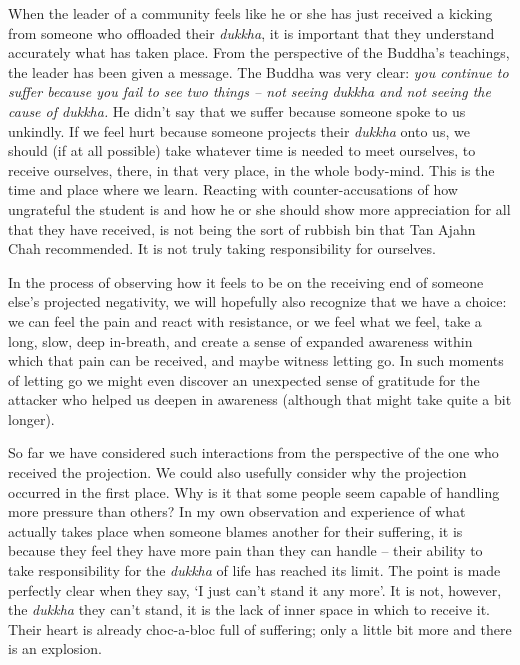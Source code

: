 When the leader of a community feels like he or she has just received a
kicking from someone who offloaded their \emph{dukkha}, it is important
that they understand accurately what has taken place. From the
perspective of the Buddha's teachings, the leader has been given a
message. The Buddha was very clear: \emph{you continue to suffer because
you fail to see two things -- not seeing dukkha and not seeing the cause
of dukkha.} He didn't say that we suffer because someone spoke to us
unkindly. If we feel hurt because someone projects their \emph{dukkha}
onto us, we should (if at all possible) take whatever time is needed to
meet ourselves, to receive ourselves, there, in that very place, in the
whole body-mind. This is the time and place where we learn. Reacting
with counter-accusations of how ungrateful the student is and how he or
she should show more appreciation for all that they have received, is
not being the sort of rubbish bin that Tan Ajahn Chah recommended. It is
not truly taking responsibility for ourselves.

In the process of observing how it feels to be on the receiving end of
someone else's projected negativity, we will hopefully also recognize
that we have a choice: we can feel the pain and react with resistance,
or we feel what we feel, take a long, slow, deep in-breath, and create a
sense of expanded awareness within which that pain can be received, and
maybe witness letting go. In such moments of letting go we might even discover
an unexpected sense of gratitude for the attacker who helped us deepen
in awareness (although that might take quite a bit longer).

So far we have considered such interactions from the perspective of the
one who received the projection. We could also usefully consider why the
projection occurred in the first place. Why is it that some people seem
capable of handling more pressure than others? In my own observation and
experience of what actually takes place when someone blames another for
their suffering, it is because they feel they have more pain than they
can handle -- their ability to take responsibility for the \emph{dukkha}
of life has reached its limit. The point is made perfectly clear when
they say, `I just can't stand it any more'. It is not, however, the
\emph{dukkha} they can't stand, it is the lack of inner space in which
to receive it. Their heart is already choc-a-bloc full of suffering; only a little bit more and there is an explosion.

